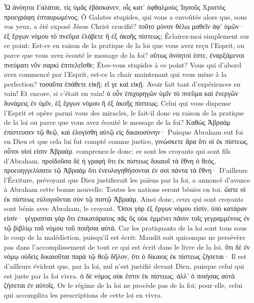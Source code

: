 \documentclass[14pt,a4paper,twoside]{extarticle}
\begin{document}
\begin{paracol}[1]
  \verset
  {Ὦ ἀνόητοι Γαλάται, τίς ὑμᾶς ἐβάσκανεν, οἷς κατ’ ὀφθαλμοὺς Ἰησοῦς Χριστὸς προεγράφη ἐσταυρωμένος;}
  {Ô Galates stupides, qui vous a envoûtés alors que, sous vos yeux, a été exposé Jésus Christ crucifié?}
  \verset
  {τοῦτο μόνον θέλω μαθεῖν ἀφ’ ὑμῶν· ἐξ ἔργων νόμου τὸ πνεῦμα ἐλάβετε ἢ ἐξ ἀκοῆς πίστεως;}
  {Éclairez-moi simplement sur ce point: Est-ce en raison de la pratique de la loi que vous avez reçu l’Esprit, ou parce que vous avez écouté le message de la foi?}
  \verset
  {οὕτως ἀνόητοί ἐστε, ἐναρξάμενοι πνεύματι νῦν σαρκὶ ἐπιτελεῖσθε;}
  {Êtes-vous stupides à ce point? Vous qui d’abord avez commencé par l’Esprit, est-ce la chair maintenant qui vous mène à la perfection?}
  \verset
  {τοσαῦτα ἐπάθετε εἰκῇ; εἴ γε καὶ εἰκῇ.}
  {Avoir fait tant d’expériences en vain! Et encore, si c’était en vain!}
  \verset
  {ὁ οὖν ἐπιχορηγῶν ὑμῖν τὸ πνεῦμα καὶ ἐνεργῶν δυνάμεις ἐν ὑμῖν, ἐξ ἔργων νόμου ἢ ἐξ ἀκοῆς πίστεως;}
  {Celui qui vous dispense l’Esprit et opère parmi vous des miracles, le fait-il donc en raison de la pratique de la loi ou parce que vous avez écouté le message de la foi?}
  \verset
  {Καθὼς Ἀβραὰμ ἐπίστευσεν τῷ θεῷ, καὶ ἐλογίσθη αὐτῷ εἰς δικαιοσύνην·}
  {Puisque Abraham eut foi en Dieu et que cela lui fut compté comme justice,}
  \verset
  {γινώσκετε ἄρα ὅτι οἱ ἐκ πίστεως, οὗτοι υἱοί εἰσιν Ἀβραάμ.}
  {comprenez-le donc: ce sont les croyants qui sont fils d’Abraham.}
  \verset
  {προϊδοῦσα δὲ ἡ γραφὴ ὅτι ἐκ πίστεως δικαιοῖ τὰ ἔθνη ὁ θεός, προευηγγελίσατο τῷ Ἀβραὰμ ὅτι ἐνευλογηθήσονται ἐν σοὶ πάντα τὰ ἔθνη·}
  {D’ailleurs l’Écriture, prévoyant que Dieu justifierait les païens par la foi, a annoncé d’avance à Abraham cette bonne nouvelle: Toutes les nations seront bénies en toi.}
  \verset
  {ὥστε οἱ ἐκ πίστεως εὐλογοῦνται σὺν τῷ πιστῷ Ἀβραάμ.}
  {Ainsi donc, ceux qui sont croyants sont bénis avec Abraham, le croyant.}
  \verset
  {Ὅσοι γὰρ ἐξ ἔργων νόμου εἰσίν, ὑπὸ κατάραν εἰσίν· γέγραπται γὰρ ὅτι ἐπικατάρατος πᾶς ὃς οὐκ ἐμμένει πᾶσιν τοῖς γεγραμμένοις ἐν τῷ βιβλίῳ τοῦ νόμου τοῦ ποιῆσαι αὐτά.}
  {Car les pratiquants de la loi sont tous sous le coup de la malédiction, puisqu’il est écrit: Maudit soit quiconque ne persévère pas dans l’accomplissement de tout ce qui est écrit dans le livre de la loi.}
  \verset
  {ὅτι δὲ ἐν νόμῳ οὐδεὶς δικαιοῦται παρὰ τῷ θεῷ δῆλον, ὅτι ὁ δίκαιος ἐκ πίστεως ζήσεται·}
  {Il est d’ailleurs évident que, par la loi, nul n’est justifié devant Dieu, puisque celui qui est juste par la foi vivra.}
  \verset
  {ὁ δὲ νόμος οὐκ ἔστιν ἐκ πίστεως, ἀλλ’ ὁ ποιήσας αὐτὰ ζήσεται ἐν αὐτοῖς.}
  {Or le régime de la loi ne procède pas de la foi; pour elle, celui qui accomplira les prescriptions de cette loi en vivra.}

\end{paracol}
\end{document}

